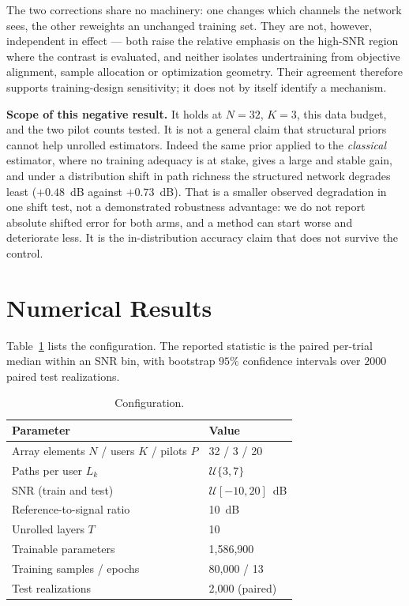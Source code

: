 \documentclass[journal]{IEEEtran}
\begin{document}
The two corrections share no machinery: one changes which channels the network
sees, the other reweights an unchanged training set. They are not, however,
independent in effect --- both raise the relative emphasis on the high-SNR
region where the contrast is evaluated, and neither isolates undertraining from
objective alignment, sample allocation or optimization geometry. Their
agreement therefore supports training-design sensitivity; it does not by itself
identify a mechanism.

\textbf{Scope of this negative result.} It holds at $N=32$, $K=3$, this data
budget, and the two pilot counts tested. It is not a general claim that
structural priors cannot help unrolled estimators. Indeed the same prior
applied to the \emph{classical} estimator, where no training adequacy is at
stake, gives a large and stable gain, and under a distribution shift in path
richness the structured network degrades least
($+0.48$~dB against $+0.73$~dB). That is a smaller observed degradation in one
shift test, not a demonstrated robustness advantage: we do not report absolute
shifted error for both arms, and a method can start worse and deteriorate less.
It is the in-distribution accuracy claim that does not survive the control.

\section{Numerical Results}
\label{sec:results}

Table~\ref{tab:params} lists the configuration. The reported statistic is the
paired per-trial median within an SNR bin, with bootstrap $95\%$ confidence
intervals over $2000$ paired test realizations.

\begin{table}[!t]
\caption{Configuration.}
\label{tab:params}
\centering
\small
\begin{tabular}{ll}
\toprule
Parameter & Value \\
\midrule
Array elements $N$ / users $K$ / pilots $P$ & 32 / 3 / 20 \\
Paths per user $L_k$ & $\mathcal{U}\{3,7\}$~\cite{xu2025} \\
SNR (train and test) & $\mathcal{U}[-10,20]$~dB \\
Reference-to-signal ratio & 10~dB \\
Unrolled layers $T$ & 10 \\
Trainable parameters & 1{,}586{,}900 \\
Training samples / epochs & 80{,}000 / 13 \\
Test realizations & 2{,}000 (paired) \\
\bottomrule
\end{tabular}
\end{table}
\end{document}
